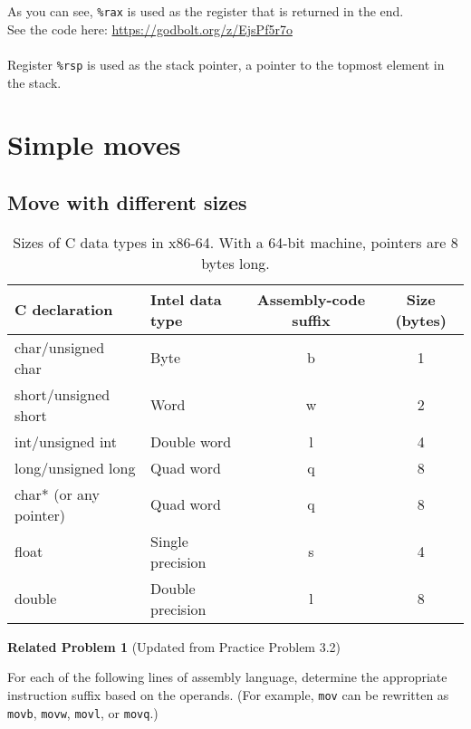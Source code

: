 \documentclass{article}
\begin{document}
As you can see, \texttt{\%rax} is used as the register that is returned in the end. \\

See the code here: \url{https://godbolt.org/z/EjsPf5r7o} \\
\\

Register \texttt{\%rsp} is used as the stack pointer, a pointer to the topmost element in the stack.
\clearpage
\section{Simple moves}
\subsection{Move with different sizes}
\begin{table}[h]
    \centering
    \small
    \renewcommand{\arraystretch}{1.2}
    \begin{tabular}{l l c c}
        \toprule
        \textbf{C declaration} & \textbf{Intel data type} & \textbf{Assembly-code suffix} & \textbf{Size (bytes)} \\
        \midrule
        char/unsigned char     & Byte             & b  & 1 \\
        short/unsigned short    & Word             & w  & 2 \\
        int/unsigned int      & Double word      & l  & 4 \\
        long/unsigned long     & Quad word        & q  & 8 \\
        char* (or any pointer)  & Quad word        & q  & 8 \\
        float    & Single precision & s  & 4 \\
        double   & Double precision & l  & 8 \\
        \bottomrule
    \end{tabular}
    \caption{Sizes of C data types in x86-64. With a 64-bit machine, pointers are 8 bytes long.}
    \label{tab:c_data_types}
\end{table}


\noindent\textbf{Related Problem 1} (Updated from Practice Problem 3.2)

\vspace{5pt}

For each of the following lines of assembly language, determine the appropriate instruction suffix based on the operands. (For example, \texttt{mov} can be rewritten as \texttt{movb}, \texttt{movw}, \texttt{movl}, or \texttt{movq}.)
\end{document}
